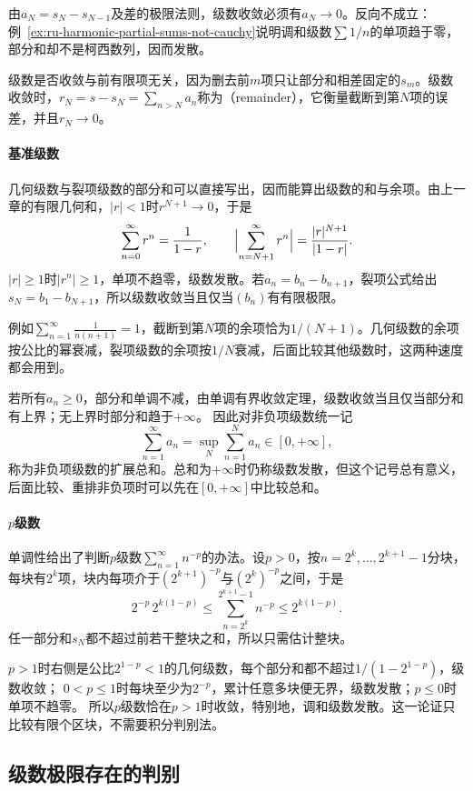 由$a_N=s_N-s_{N-1}$及差的极限法则，级数收敛必须有$a_N\to0$。反向不成立：例~\ref{ex:ru-harmonic-partial-sums-not-cauchy}说明调和级数$\sum1/n$的单项趋于零，部分和却不是柯西数列，因而发散。

级数是否收敛与前有限项无关，因为删去前$m$项只让部分和相差固定的$s_m$。级数收敛时，$r_N=s-s_N=\sum_{n>N}a_n$称为（remainder），它衡量截断到第$N$项的误差，并且$r_N\to0$。

\paragraph{基准级数}
几何级数与裂项级数的部分和可以直接写出，因而能算出级数的和与余项。由上一章的有限几何和，$|r|<1$时$r^{N+1}\to0$，于是
\begin{equation}
 \sum_{n=0}^\infty r^n=\frac1{1-r},\qquad \Bigl|\sum_{n=N+1}^\infty r^n\Bigr|=\frac{|r|^{N+1}}{|1-r|}.
 \label{eq:analysis-geometric-series}
\end{equation}
$|r|\geq1$时$|r^n|\geq1$，单项不趋零，级数发散。若$a_n=b_n-b_{n+1}$，裂项公式给出$s_N=b_1-b_{N+1}$，所以级数收敛当且仅当$(b_n)$有有限极限。

例如$\sum_{n=1}^\infty\frac1{n(n+1)}=1$，截断到第$N$项的余项恰为$1/(N+1)$。几何级数的余项按公比的幂衰减，裂项级数的余项按$1/N$衰减，后面比较其他级数时，这两种速度都会用到。

若所有$a_n\geq0$，部分和单调不减，由单调有界收敛定理，级数收敛当且仅当部分和有上界；无上界时部分和趋于$+\infty$。
因此对非负项级数统一记
\[
 \sum_{n=1}^\infty a_n=\sup_N\sum_{n=1}^Na_n\in[0,+\infty],
\]
称为非负项级数的扩展总和。总和为$+\infty$时仍称级数发散，但这个记号总有意义，后面比较、重排非负项时可以先在$[0,+\infty]$中比较总和。

\paragraph{$p$级数}
单调性给出了判断$p$级数$\sum_{n=1}^\infty n^{-p}$的办法。设$p>0$，按$n=2^k,\ldots,2^{k+1}-1$分块，每块有$2^k$项，块内每项介于$(2^{k+1})^{-p}$与$(2^k)^{-p}$之间，于是
\[
 2^{-p}\,2^{k(1-p)}\leq\sum_{n=2^k}^{2^{k+1}-1}n^{-p}\leq2^{k(1-p)}.
\]
任一部分和$s_N$都不超过前若干整块之和，所以只需估计整块。

$p>1$时右侧是公比$2^{1-p}<1$的几何级数，每个部分和都不超过$1/(1-2^{1-p})$，级数收敛；
$0<p\leq1$时每块至少为$2^{-p}$，累计任意多块便无界，级数发散；$p\leq0$时单项不趋零。
所以$p$级数恰在$p>1$时收敛，特别地，调和级数发散。这一论证只比较有限个区块，不需要积分判别法。

\subsection{级数极限存在的判别}
\label{sec:ru-series-tests}
\label{sec:analysis-series-tests}

